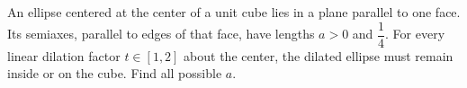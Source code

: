 An ellipse centered at the center of a unit cube lies in a plane parallel to one face. Its semiaxes, parallel to edges of that face, have lengths $a>0$ and $\dfrac{1}{4}$. For every linear dilation factor $t\in[1,2]$ about the center, the dilated ellipse must remain inside or on the cube. Find all possible $a$.
